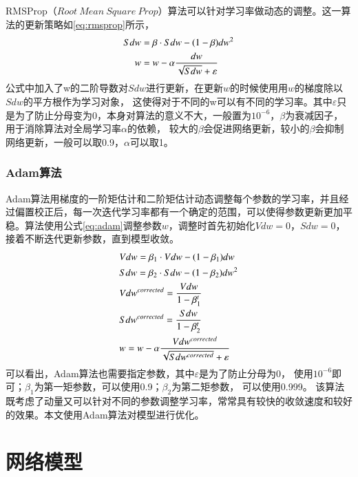 RMSProp（$Root~Mean~Square~Prop$）算法\cite{hinton2012neural}可以针对学习率做动态的调整。这一算法的更新策略如\eqref{eq:rmsprop}所示，
\begin{equation}
\begin{aligned}
\centering
Sdw & =\beta \cdot Sdw-(1-\beta )dw^2 \\
w & =w- \alpha \frac{dw}{\sqrt{Sdw}+\varepsilon }
\end{aligned}
\label{eq:rmsprop}
\end{equation}
公式中加入了w的二阶导数对$Sdw$进行更新，在更新$w$的时候使用用$w$的梯度除以$Sdw$的平方根作为学习对象，
这使得对于不同的w可以有不同的学习率。其中$\varepsilon$只是为了防止分母变为0，本身对算法的意义不大，一般置为${10}^{-6}$，$\beta$为衰减因子，用于消除算法对全局学习率$\alpha$的依赖，
较大的$\beta$会促进网络更新，较小的$\beta$会抑制网络更新，一般可以取0.9，$\alpha$可以取1。

\subsubsection{Adam算法}

Adam\cite{kingma2014adam}算法用梯度的一阶矩估计和二阶矩估计动态调整每个参数的学习率，并且经过偏置校正后，每一次迭代学习率都有一个确定的范围，可以使得参数更新更加平稳。算法使用公式\eqref{eq:adam}调整参数$w$，调整时首先初始化$Vdw=0$，$Sdw=0$，
接着不断迭代更新参数，直到模型收敛。
\begin{equation}
\begin{aligned}
\centering
&Vdw  =\beta_1 \cdot Vdw-(1-\beta_1 )dw \\
&Sdw  =\beta_2 \cdot Sdw-(1-\beta_2 )dw^2 \\
&Vdw^{corrected}  =\frac{Vdw}{1-\beta_1^t}\\
&Sdw^{corrected}  =\frac{Sdw}{1-\beta_2^t}\\
&w  =w- \alpha \frac{Vdw^{corrected}}{\sqrt{Sdw^{corrected}}+\varepsilon }
\end{aligned}
\label{eq:adam}
\end{equation}
可以看出，Adam算法也需要指定参数，其中$\varepsilon$是为了防止分母为0，
使用${10}^{-6}$即可；$\beta_1$为第一矩参数，可以使用0.9；$\beta_2$为第二矩参数，
可以使用0.999。
该算法既考虑了动量又可以针对不同的参数调整学习率，常常具有较快的收敛速度和较好的效果。本文使用Adam算法对模型进行优化。

\section{网络模型}

